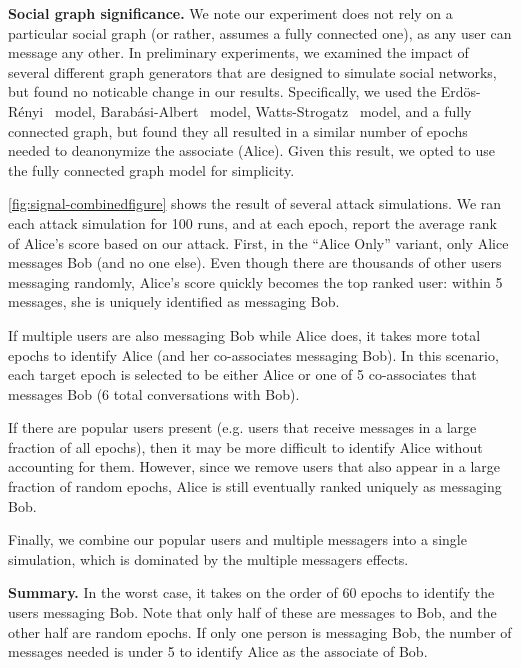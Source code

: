 \medskip \noindent
\textbf{Social graph significance.}
We note our experiment does not rely on a particular social graph (or rather,
assumes a fully connected one), as any user
can message any other. In preliminary experiments, we examined the impact 
of several different graph
generators that are designed to simulate social networks, but found 
no noticable change in our results. Specifically, we used
the Erd{\"o}s-R{\'e}nyi~\cite{erdos1959random} model,
Barab{\'a}si-Albert~\cite{albert2002statistical} model,
Watts-Strogatz~\cite{watts1998collective} model, and a fully connected graph,
but found they all resulted in a similar number of epochs
needed to deanonymize the associate (Alice). Given this result, we opted to use
the fully connected graph model for simplicity.




\cref{fig:signal-combinedfigure} shows the result of several attack simulations.
We ran each attack simulation for 100 runs, and at each epoch, report the
average rank of Alice's score based on our attack.
First, in the ``Alice Only'' variant, only Alice messages Bob (and no one else).
Even though there are thousands of other users messaging randomly, Alice's score
quickly becomes the top ranked user: within 5 messages, she is uniquely
identified as messaging Bob. 

If multiple users are also messaging Bob while Alice
does, it takes more total epochs to identify Alice (and her co-associates
messaging Bob). In this scenario, each target epoch is selected to be either
Alice or one of 5 co-associates that messages Bob (6 total conversations with Bob).

If there are popular users present (e.g. users that receive messages in a large
fraction of all epochs), then it may be more difficult to identify Alice without
accounting for them. However, since we remove users that also appear in a large
fraction of random epochs, Alice is still eventually ranked uniquely as messaging Bob.



Finally, we combine our popular users and multiple messagers into a single simulation,
which is dominated by the multiple messagers effects.

\medskip \noindent
\textbf{Summary.}
In the worst case, it takes on the order of 60 epochs to identify the users
messaging Bob. Note that only half of these are messages to Bob, and the other half are random epochs.
If only one person is messaging Bob, the number of messages needed is under 5 to
identify Alice as the associate of Bob.


